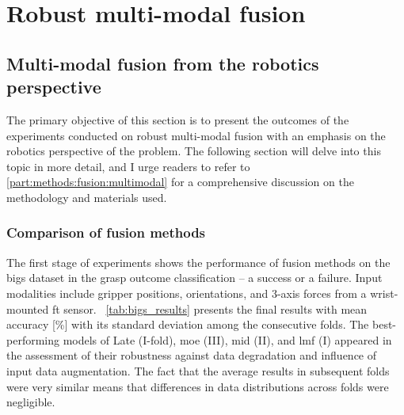 \documentclass[a4paper, 10pt, twoside]{report}
\begin{document}
\chapter{Robust multi-modal fusion}
\label{part:experiments:fusion}

\section{Multi-modal fusion from the robotics perspective}
\label{part:experiments:fusion:multi}

The primary objective of this section is to present the outcomes of the experiments conducted on robust multi-modal fusion with an emphasis on the robotics perspective of the problem. The following section will delve into this topic in more detail, and I urge readers to refer to \ref{part:methods:fusion:multimodal} for a comprehensive discussion on the methodology and materials used.

\subsection{Comparison of fusion methods}
\label{part:experiments:fusion:multi:comparison}

The first stage of experiments shows the performance of fusion methods on the \acrshort{bigs} dataset in the grasp outcome classification -- a success or a failure. Input modalities include gripper positions, orientations, and 3-axis forces from a wrist-mounted \acrshort{ft} sensor. \Table~\ref{tab:bigs_results} presents the final results with mean accuracy [\%] with its standard deviation among the consecutive folds. The best-performing models of Late (I-fold), \acrshort{moe} (III), \acrshort{mid} (II), and \acrshort{lmf} (I) appeared in the assessment of their robustness against data degradation and influence of input data augmentation. The fact that the average results in subsequent folds were very similar means that differences in data distributions across folds were negligible.
\end{document}
